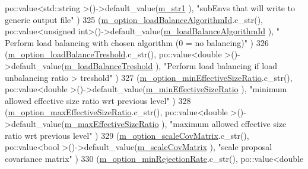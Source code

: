 \begin{DoxyCode}
      po::value<std::string >()->default\_value(\hyperlink{class_q_u_e_s_o_1_1_m_l_sampling_level_options_ac3586b30eb3e0f67e44074073bb157ff}{m\_str1}                                     ), \textcolor{stringliteral}{"subEnvs that will write to
       generic output file"}                  )
325     (\hyperlink{class_q_u_e_s_o_1_1_m_l_sampling_level_options_aad6ce1095a38c062d5f1d9ca9e215671}{m\_option\_loadBalanceAlgorithmId}.c\_str(),                     
      po::value<unsigned int>()->default\_value(\hyperlink{class_q_u_e_s_o_1_1_m_l_sampling_level_options_af8f5d4ef3048da3e201e43ecc0a399fb}{m\_loadBalanceAlgorithmId}                   ), \textcolor{stringliteral}{"
      Perform load balancing with chosen algorithm (0 = no balancing)"} )
326     (\hyperlink{class_q_u_e_s_o_1_1_m_l_sampling_level_options_a818c93c8f5534e93b60246f9a46dbb89}{m\_option\_loadBalanceTreshold}.c\_str(),                        
      po::value<double      >()->default\_value(\hyperlink{class_q_u_e_s_o_1_1_m_l_sampling_level_options_a1cef7bbef6c1017714281e8e464367d6}{m\_loadBalanceTreshold}                      ), \textcolor{stringliteral}{"Perform load
       balancing if load unbalancing ratio > treshold"}     )
327     (\hyperlink{class_q_u_e_s_o_1_1_m_l_sampling_level_options_a424cb93232913921ebde9cbca932a5c1}{m\_option\_minEffectiveSizeRatio}.c\_str(),                      
      po::value<double      >()->default\_value(\hyperlink{class_q_u_e_s_o_1_1_m_l_sampling_level_options_a58904c5920d9fa6673a8222529d5c143}{m\_minEffectiveSizeRatio}                    ), \textcolor{stringliteral}{"minimum
       allowed effective size ratio wrt previous level"}         )
328     (\hyperlink{class_q_u_e_s_o_1_1_m_l_sampling_level_options_adbc38162386ba0751cdf09cdeefae07f}{m\_option\_maxEffectiveSizeRatio}.c\_str(),                      
      po::value<double      >()->default\_value(\hyperlink{class_q_u_e_s_o_1_1_m_l_sampling_level_options_a6740534c2a37694cbc3775dbf60619a1}{m\_maxEffectiveSizeRatio}                    ), \textcolor{stringliteral}{"maximum
       allowed effective size ratio wrt previous level"}         )
329     (\hyperlink{class_q_u_e_s_o_1_1_m_l_sampling_level_options_aa1f82f5b58286f8b2565d80cc33dec4f}{m\_option\_scaleCovMatrix}.c\_str(),                             po::value<bool    
          >()->default\_value(\hyperlink{class_q_u_e_s_o_1_1_m_l_sampling_level_options_ac7deaeedd0deebf8ee14414fa3dbd334}{m\_scaleCovMatrix}                           ), \textcolor{stringliteral}{"scale proposal
       covariance matrix"}                                )
330     (\hyperlink{class_q_u_e_s_o_1_1_m_l_sampling_level_options_a384a262aeb20ef3ff57e9dd4697b464e}{m\_option\_minRejectionRate}.c\_str(),                           po::value<double

\end{DoxyCode}
